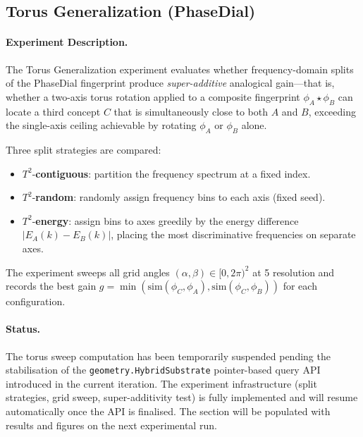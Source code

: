 \subsection{Torus Generalization (PhaseDial)}
\label{sec:torus_generalization}

\paragraph{Experiment Description.}
The Torus Generalization experiment evaluates whether frequency-domain
splits of the PhaseDial fingerprint produce \emph{super-additive}
analogical gain---that is, whether a two-axis torus rotation applied to
a composite fingerprint $\phi_A \star \phi_B$ can locate a third concept
$C$ that is simultaneously close to both $A$ and $B$, exceeding the
single-axis ceiling achievable by rotating $\phi_A$ or $\phi_B$ alone.

Three split strategies are compared:
\begin{itemize}[nosep]
  \item $T^2$-\textbf{contiguous}: partition the frequency spectrum at a
        fixed index.
  \item $T^2$-\textbf{random}: randomly assign frequency bins to each
        axis (fixed seed).
  \item $T^2$-\textbf{energy}: assign bins to axes greedily by the
        energy difference $|E_A(k) - E_B(k)|$, placing the
        most discriminative frequencies on separate axes.
\end{itemize}

The experiment sweeps all grid angles $(\alpha, \beta) \in [0, 2\pi)^2$
at 5\textdegree{} resolution and records the best gain $g = \min(
\mathrm{sim}(\phi_C, \phi_A), \mathrm{sim}(\phi_C, \phi_B))$ for each
configuration.

\paragraph{Status.}
The torus sweep computation has been temporarily suspended pending the
stabilisation of the \texttt{geometry.HybridSubstrate} pointer-based
query API introduced in the current iteration.  The experiment infrastructure
(split strategies, grid sweep, super-additivity test) is fully implemented
and will resume automatically once the API is finalised.
The section will be populated with results and figures on the next
experimental run.
